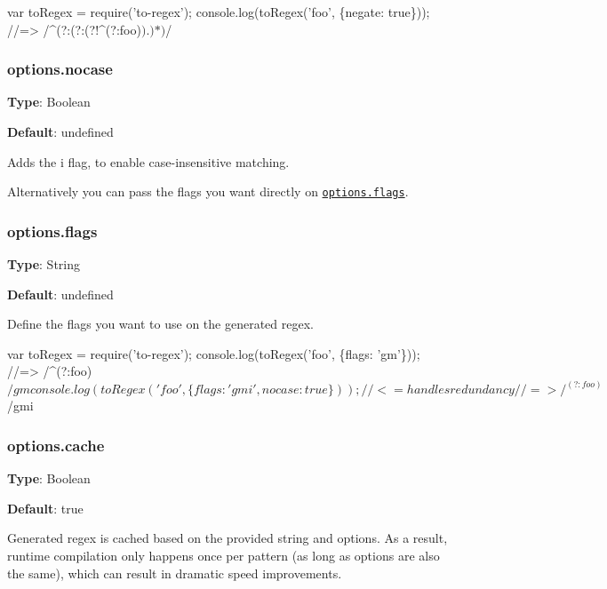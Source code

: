 \begin{DoxyCode}
var toRegex = require('to-regex');
console.log(toRegex('foo', \{negate: true\}));
//=> /^(?:(?:(?!^(?:foo)$).)*)$/
\end{DoxyCode}


\subsubsection*{options.\+nocase}

{\bfseries Type}\+: {\ttfamily Boolean}

{\bfseries Default}\+: {\ttfamily undefined}

Adds the {\ttfamily i} flag, to enable case-\/insensitive matching.




Alternatively you can pass the flags you want directly on \href{#options.flags}{\tt options.\+flags}.

\subsubsection*{options.\+flags}

{\bfseries Type}\+: {\ttfamily String}

{\bfseries Default}\+: {\ttfamily undefined}

Define the flags you want to use on the generated regex.


\begin{DoxyCode}
var toRegex = require('to-regex');
console.log(toRegex('foo', \{flags: 'gm'\}));
//=> /^(?:foo)$/gm
console.log(toRegex('foo', \{flags: 'gmi', nocase: true\})); //<= handles redundancy
//=> /^(?:foo)$/gmi
\end{DoxyCode}


\subsubsection*{options.\+cache}

{\bfseries Type}\+: {\ttfamily Boolean}

{\bfseries Default}\+: {\ttfamily true}

Generated regex is cached based on the provided string and options. As a result, runtime compilation only happens once per pattern (as long as options are also the same), which can result in dramatic speed improvements.

